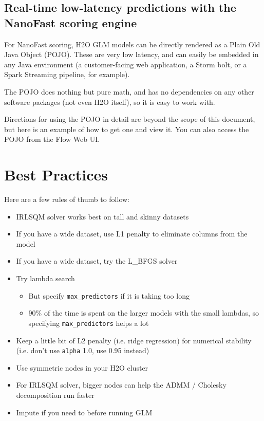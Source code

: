 \subsection{Real-time low-latency predictions with the NanoFast scoring engine}

For NanoFast scoring, H2O GLM models can be directly rendered as a Plain Old Java Object (POJO).  These are very
low latency, and can easily be embedded in any Java environment (a customer-facing web application, a Storm bolt,
or a Spark Streaming pipeline, for example).

The POJO does nothing but pure math, and has no dependencies on any other software packages (not even H2O itself),
so it is easy to work with.

Directions for using the POJO in detail are beyond the scope of this document, but here is an example of how to get
one and view it.  You can also access the POJO from the Flow Web UI.

\bigskip
\waterExampleInR




\section{Best Practices}

Here are a few rules of thumb to follow:

\begin{itemize}
\item IRLSQM solver works best on tall and skinny datasets
\item If you have a wide dataset, use L1 penalty to eliminate columns from the model
\item If you have a wide dataset, try the L\_BFGS solver
\item Try lambda search
      \begin{itemize}
      \item But specify \texttt{max\_predictors} if it is taking too long
      \item 90\% of the time is spent on the larger models with the small lambdas, so specifying \texttt{max\_predictors} helps a lot
      \end{itemize}
\item Keep a little bit of L2 penalty (i.e. ridge regression) for numerical stability (i.e. don’t use \texttt{alpha} 1.0, use 0.95 instead)
\item Use symmetric nodes in your H2O cluster
\item For IRLSQM solver, bigger nodes can help the ADMM / Cholesky decomposition run faster
\item Impute if you need to before running GLM
\end{itemize}

